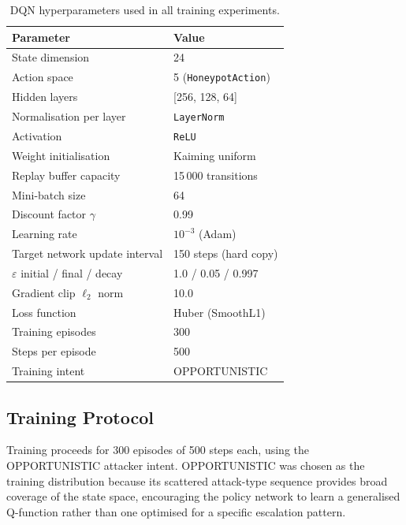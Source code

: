 \begin{table}[ht]
  \centering
  \caption{DQN hyperparameters used in all training experiments.}
  \label{tab:hyperparams}
  \begin{tabular}{ll}
    \toprule
    Parameter & Value \\
    \midrule
    State dimension & 24 \\
    Action space & 5 (\texttt{HoneypotAction}) \\
    Hidden layers & [256, 128, 64] \\
    Normalisation per layer & \texttt{LayerNorm} \\
    Activation & \texttt{ReLU} \\
    Weight initialisation & Kaiming uniform \\
    Replay buffer capacity & 15\,000 transitions \\
    Mini-batch size & 64 \\
    Discount factor $\gamma$ & 0.99 \\
    Learning rate & $10^{-3}$ (Adam) \\
    Target network update interval & 150 steps (hard copy) \\
    $\varepsilon$ initial / final / decay & 1.0 / 0.05 / 0.997 \\
    Gradient clip $\ell_2$ norm & 10.0 \\
    Loss function & Huber (SmoothL1) \\
    Training episodes & 300 \\
    Steps per episode & 500 \\
    Training intent & OPPORTUNISTIC \\
    \bottomrule
  \end{tabular}
\end{table}

\subsection{Training Protocol}

Training proceeds for 300 episodes of 500 steps each, using the
OPPORTUNISTIC attacker intent.
OPPORTUNISTIC was chosen as the training distribution because its scattered
attack-type sequence provides broad coverage of the state space, encouraging
the policy network to learn a generalised Q-function rather than one
optimised for a specific escalation pattern.

